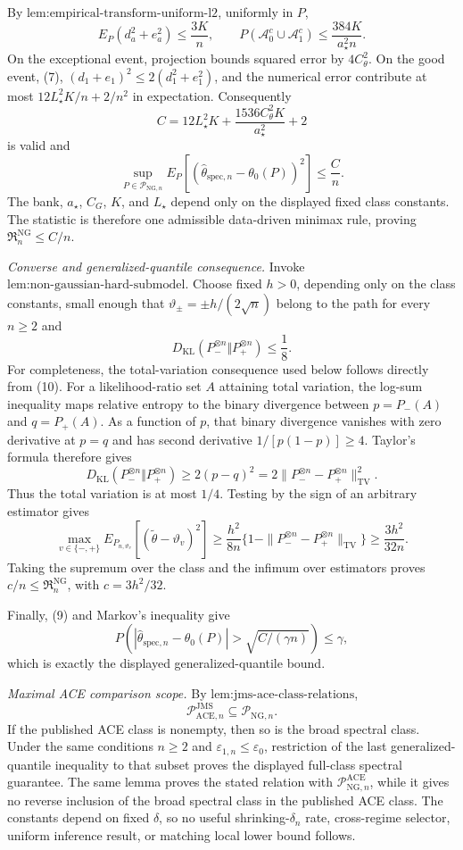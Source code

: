 By \(\text{lem:empirical-transform-uniform-l2}\), uniformly in \(P\),
\[
 E_P(d_a^2+e_a^2)\le\frac{3K}{n},
 \qquad
 P(\mathcal A_0^c\cup\mathcal A_1^c)
 \le\frac{384K}{a_{\star}^2n}. \tag{8}
\]
On the exceptional event, projection bounds squared error by \(4C_{\theta}^2\).  On the good event, (7), \((d_1+e_1)^2\le2(d_1^2+e_1^2)\), and the numerical error contribute at most \(12L_{\star}^2K/n+2/n^2\) in expectation.  Consequently
\[
 C=12L_{\star}^2K+\frac{1536C_{\theta}^2K}{a_{\star}^2}+2
\]
is valid and
\[
 \sup_{P\in\mathcal P_{\mathrm{NG},n}}
 E_P[(\widehat\theta_{\mathrm{spec},n}-\theta_0(P))^2]
 \le\frac Cn. \tag{9}
\]
The bank, \(a_{\star}\), \(C_G\), \(K\), and \(L_{\star}\) depend only on the displayed fixed class constants.  The statistic is therefore one admissible data-driven minimax rule, proving \(\mathfrak R_n^{\mathrm{NG}}\le C/n\).

\emph{Converse and generalized-quantile consequence.}  Invoke \(\text{lem:non-gaussian-hard-submodel}\).  Choose fixed \(h>0\), depending only on the class constants, small enough that \(\vartheta_{\pm}=\pm h/(2\sqrt n)\) belong to the path for every \(n\ge2\) and
\[
 D_{\mathrm{KL}}(P_-^{\otimes n}\Vert P_+^{\otimes n})\le\frac18. \tag{10}
\]
For completeness, the total-variation consequence used below follows directly from (10).  For a likelihood-ratio set \(A\) attaining total variation, the log-sum inequality maps relative entropy to the binary divergence between \(p=P_-(A)\) and \(q=P_+(A)\).  As a function of \(p\), that binary divergence vanishes with zero derivative at \(p=q\) and has second derivative \(1/[p(1-p)]\ge4\).  Taylor's formula therefore gives
\[
 D_{\mathrm{KL}}(P_-^{\otimes n}\Vert P_+^{\otimes n})
 \ge2(p-q)^2
 =2\|P_-^{\otimes n}-P_+^{\otimes n}\|_{\mathrm{TV}}^2.
\]
Thus the total variation is at most \(1/4\).  Testing by the sign of an arbitrary estimator gives
\[
 \max_{v\in\{-,+\}}E_{P_{n,\vartheta_v}}
 [ (\widetilde\theta-\vartheta_v)^2]
 \ge\frac{h^2}{8n}
 \{1-\|P_-^{\otimes n}-P_+^{\otimes n}\|_{\mathrm{TV}}\}
 \ge\frac{3h^2}{32n}.
\]
Taking the supremum over the class and the infimum over estimators proves \(c/n\le\mathfrak R_n^{\mathrm{NG}}\), with \(c=3h^2/32\).

Finally, (9) and Markov's inequality give
\[
 P\!\left(|\widehat\theta_{\mathrm{spec},n}-\theta_0(P)|>
 \sqrt{C/(\gamma n)}\right)\le\gamma,
\]
which is exactly the displayed generalized-quantile bound.

\emph{Maximal ACE comparison scope.}  By \(\text{lem:jms-ace-class-relations}\),
\[
 \mathcal P_{\mathrm{ACE},n}^{\mathrm{JMS}}
 \subseteq\mathcal P_{\mathrm{NG},n}.
\]
If the published ACE class is nonempty, then so is the broad spectral class.  Under the same conditions \(n\ge2\) and \(\varepsilon_{1,n}\le\varepsilon_0\), restriction of the last generalized-quantile inequality to that subset proves the displayed full-class spectral guarantee.  The same lemma proves the stated relation with \(\mathcal P_{\mathrm{NG},n}^{\mathrm{ACE}}\), while it gives no reverse inclusion of the broad spectral class in the published ACE class.  The constants depend on fixed \(\delta\), so no useful shrinking-\(\delta_n\) rate, cross-regime selector, uniform inference result, or matching local lower bound follows.